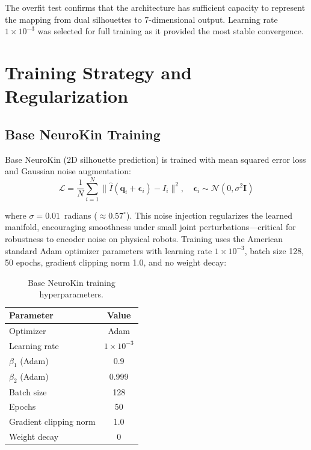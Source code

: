 \documentclass[12pt,a4paper,oneside]{report}
\begin{document}
The overfit test confirms that the architecture has sufficient capacity to represent the mapping from dual silhouettes to 7-dimensional output. Learning rate $1 \times 10^{-3}$ was selected for full training as it provided the most stable convergence.
\section{Training Strategy and Regularization}
\subsection{Base NeuroKin Training}
\label{subsec:base_neurokin_training}

Base NeuroKin (2D silhouette prediction) is trained with mean squared error loss and Gaussian noise augmentation:
\begin{equation}\mathcal{L} = \frac{1}{N} \sum_{i=1}^{N} \|\hat{I}(\mathbf{q}_i + \boldsymbol{\epsilon}_i) - I_i\|^2, \quad \boldsymbol{\epsilon}_i \sim \mathcal{N}(0, \sigma^2 \mathbf{I})
\end{equation}

where $\sigma = 0.01$~radians ($\approx 0.57^\circ$). This noise injection regularizes the learned manifold, encouraging smoothness under small joint perturbations---critical for robustness to encoder noise on physical robots. Training uses the American standard Adam optimizer parameters with learning rate $1 \times 10^{-3}$, batch size 128, 50 epochs, gradient clipping norm 1.0, and no weight decay:
\begin{table}[H]
\centering

\caption{Base NeuroKin training hyperparameters.}
\label{tab:neurokin_hyperparams}
\begin{tabular}{lc}
\toprule

Parameter & Value \\
\midrule

Optimizer & Adam \\

Learning rate & $1 \times 10^{-3}$ \\
$\beta_1$ (Adam) & 0.9 \\
$\beta_2$ (Adam) & 0.999 \\

Batch size & 128 \\

Epochs & 50 \\

Gradient clipping norm & 1.0 \\

Weight decay & 0 \\
\bottomrule

\end{tabular}
\end{table}
\end{document}
